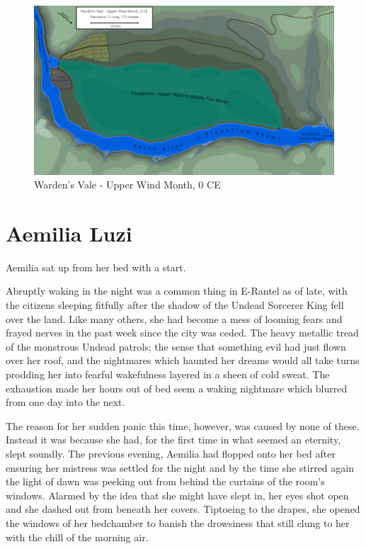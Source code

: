 \begin{figure}
    \centering
    \includegraphics[width=1\textwidth]{images/jdtMD59.png}
    \caption*{Warden's Vale - Upper Wind Month, 0 CE}
\end{figure}


\chapter{Aemilia Luzi}

Aemilia sat up from her bed with a start.

 

Abruptly waking in the night was a common thing in E-Rantel as of late, with the citizens sleeping fitfully after the shadow of the Undead Sorcerer King fell over the land. Like many others, she had become a mess of looming fears and frayed nerves in the past week since the city was ceded. The heavy metallic tread of the monstrous Undead patrols; the sense that something evil had just flown over her roof, and the nightmares which haunted her dreams would all take turns prodding her into fearful wakefulness layered in a sheen of cold sweat. The exhaustion made her hours out of bed seem a waking nightmare which blurred from one day into the next.

 

The reason for her sudden panic this time, however, was caused by none of these. Instead it was because she had, for the first time in what seemed an eternity, slept soundly. The previous evening, Aemilia had flopped onto her bed after ensuring her mistress was settled for the night and by the time she stirred again the light of dawn was peeking out from behind the curtains of the room’s windows. Alarmed by the idea that she might have slept in, her eyes shot open and she dashed out from beneath her covers. Tiptoeing to the drapes, she opened the windows of her bedchamber to banish the drowsiness that still clung to her with the chill of the morning air.

